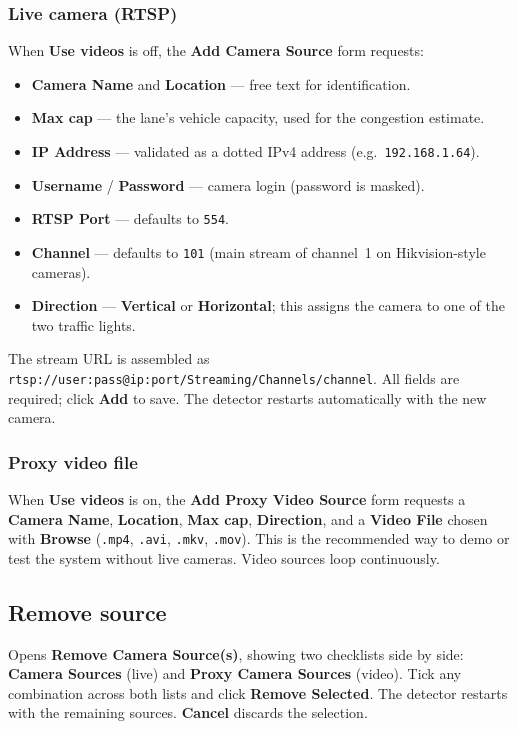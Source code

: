 \documentclass[11pt]{article}
\newcommand{\code}[1]{\texttt{#1}}
\newcommand{\ui}[1]{\textbf{#1}}
\begin{document}
\subsubsection{Live camera (RTSP)}
When \ui{Use videos} is off, the \ui{Add Camera Source} form requests:
\begin{itemize}[nosep]
  \item \ui{Camera Name} and \ui{Location} --- free text for identification.
  \item \ui{Max cap} --- the lane's vehicle capacity, used for the congestion
        estimate.
  \item \ui{IP Address} --- validated as a dotted IPv4 address (e.g.\
        \code{192.168.1.64}).
  \item \ui{Username} / \ui{Password} --- camera login (password is masked).
  \item \ui{RTSP Port} --- defaults to \code{554}.
  \item \ui{Channel} --- defaults to \code{101} (main stream of channel~1 on
        Hikvision-style cameras).
  \item \ui{Direction} --- \ui{Vertical} or \ui{Horizontal}; this assigns the
        camera to one of the two traffic lights.
\end{itemize}
The stream URL is assembled as
\code{rtsp://user:pass@ip:port/Streaming/Channels/channel}. All fields are
required; click \ui{Add} to save. The detector restarts automatically with the
new camera.

\subsubsection{Proxy video file}
When \ui{Use videos} is on, the \ui{Add Proxy Video Source} form requests a
\ui{Camera Name}, \ui{Location}, \ui{Max cap}, \ui{Direction}, and a
\ui{Video File} chosen with \ui{Browse} (\code{.mp4}, \code{.avi}, \code{.mkv},
\code{.mov}). This is the recommended way to demo or test the system without
live cameras. Video sources loop continuously.

\subsection{Remove source}
Opens \ui{Remove Camera Source(s)}, showing two checklists side by side:
\ui{Camera Sources} (live) and \ui{Proxy Camera Sources} (video). Tick any
combination across both lists and click \ui{Remove Selected}. The detector
restarts with the remaining sources. \ui{Cancel} discards the selection.
\end{document}
